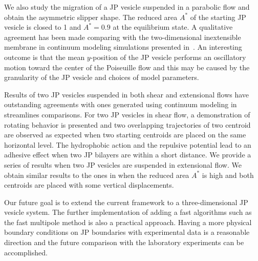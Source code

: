 \documentclass[lineno]{jfm}
\begin{document}
We also study the migration of a JP vesicle suspended in a parabolic flow and obtain the asymmetric slipper shape. The reduced area $A^*$ of the starting JP vesicle is closed to 1 and $A^*=0.9$ at the equilibrium
state. A qualitative agreement has been made comparing with the two-dimensional inextensible membrane in continuum modeling simulations presented in~\cite{Kaoui09}. An interesting outcome is that the mean
$y$-position of the JP vesicle performs an oscillatory motion toward the center of the Poiseuille flow and this
may be caused by the granularity of the JP vesicle and choices of model parameters.


Results of two JP vesicles suspended in both shear and extensional flows have outstanding agreements with ones generated using continuum modeling in streamlines comparisons.
For two JP vesicles in shear flow, a demonstration of rotating behavior is presented and two overlapping 
trajectories of two centroid are observed as expected when two starting centroids are placed on the same 
horizontal level. The hydrophobic action and the repulsive potential lead to an adhesive effect when two 
JP bilayers are within a short distance.
We provide a series of results when two JP vesicles are suspended in extensional flow. We obtain similar results to the ones in \cite{qua-vee-you2019} when the reduced area $A^*$ is high and both centroids are placed 
with some vertical displacements.



Our future goal is to extend the current framework to a three-dimensional JP vesicle system. 
The further implementation of adding a fast algorithms such as the fast multipole method is also a 
practical approach.
Having a more physical boundary conditions on JP boundaries with experimental data is a reasonable direction and the future comparison with the laboratory experiments can be accomplished.







\begin{acknowledgments}
\end{acknowledgments}

%


\end{document}
